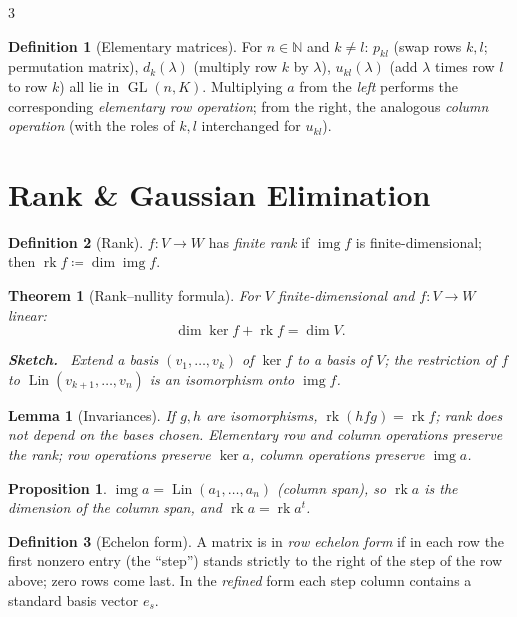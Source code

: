 \documentclass[10pt,a4paper,landscape]{article}
\theoremstyle{definition}
\newtheorem{defn}{Definition}[section]
\theoremstyle{plain}
\newtheorem{thm}{Theorem}[section]
\newtheorem{lem}{Lemma}[section]
\newtheorem{prop}{Proposition}[section]
\theoremstyle{remark}
\newcommand{\N}{\mathbb{N}}
\newcommand{\deq}{\coloneqq}
\DeclareMathOperator{\Lin}{Lin}
\DeclareMathOperator{\GL}{GL}
\DeclareMathOperator{\rk}{rk}
\DeclareMathOperator{\img}{img}
\newenvironment{proofsketch}{%
  \par\small\color{exgray}\textbf{Sketch.}\ }%
  {\par}
\begin{document}
\begin{multicols*}{3}
\begin{defn}[Elementary matrices]
For $n \in \N$ and $k \neq l$: $p_{kl}$ (swap rows $k,l$; permutation matrix), $d_k(\lambda)$ (multiply row $k$ by $\lambda$), $u_{kl}(\lambda)$ (add $\lambda$ times row $l$ to row $k$) all lie in $\GL(n,K)$. Multiplying $a$ from the \emph{left} performs the corresponding \emph{elementary row operation}; from the right, the analogous \emph{column operation} (with the roles of $k,l$ interchanged for $u_{kl}$).
\end{defn}

\section{Rank \& Gaussian Elimination}

\begin{defn}[Rank]
$f: V \to W$ has \emph{finite rank} if $\img f$ is finite-dimensional; then $\rk f \deq \dim \img f$.
\end{defn}

\begin{thm}[Rank--nullity formula]
For $V$ finite-dimensional and $f: V \to W$ linear:
\[
\dim \ker f + \rk f = \dim V.
\]
\begin{proofsketch}
Extend a basis $(v_1, \dots, v_k)$ of $\ker f$ to a basis of $V$; the restriction of $f$ to $\Lin(v_{k+1}, \dots, v_n)$ is an isomorphism onto $\img f$.
\end{proofsketch}
\end{thm}

\begin{lem}[Invariances]
If $g, h$ are isomorphisms, $\rk(hfg) = \rk f$; rank does not depend on the bases chosen. Elementary row and column operations preserve the rank; \emph{row} operations preserve $\ker a$, \emph{column} operations preserve $\img a$.
\end{lem}

\begin{prop}
$\img a = \Lin(a_1, \dots, a_n)$ (column span), so $\rk a$ is the dimension of the column span, and $\rk a = \rk a^t$.
\end{prop}

\begin{defn}[Echelon form]
A matrix is in \emph{row echelon form} if in each row the first nonzero entry (the ``step'') stands strictly to the right of the step of the row above; zero rows come last. In the \emph{refined} form each step column contains a standard basis vector $e_s$.
\end{defn}


\end{multicols*}
\end{document}
